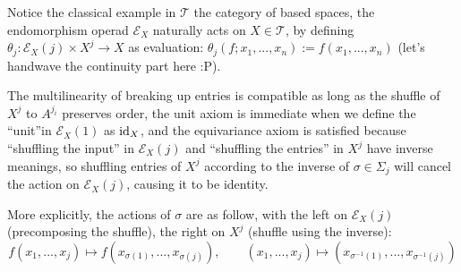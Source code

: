 \documentclass{article}
\begin{document}
\begin{exmp}
    Notice the classical example in $\mathcal{T}$ the category of based spaces, the endomorphism operad $\mathcal{E}_X$ naturally acts on $X\in\mathcal{T}$, by defining $\theta_j:\mathcal{E}_X (j)\times X^j\rightarrow X$ as evaluation: $\theta_j (f; x_1,...,x_n):= f(x_1,...,x_n)$ (let's handwave the continuity part here :P). 

    The multilinearity of breaking up entries is compatible as long as the shuffle of $X^j$ to $A^{j_i}$ preserves order, the unit axiom is immediate when we define the ``unit''in $\mathcal{E}_X (1)$ as $\mathrm{id}_X$, and the equivariance axiom is satisfied because ``shuffling the input'' in $\mathcal{E}_X (j)$ and ``shuffling the entries'' in $X^j$ have inverse meanings, so shuffling entries of $X^j$ according to the inverse of $\sigma\in \Sigma_j$ will cancel the action on $\mathcal{E}_X (j)$, causing it to be identity.

    More explicitly, the actions of $\sigma$ are as follow, with the left on $\mathcal{E}_X (j)$ (precomposing the shuffle), the right on $X^j$ (shuffle using the inverse):
    \[f(x_1,...,x_j)\mapsto f(x_{\sigma(1)},...,x_{\sigma(j)}),\quad\quad (x_1,...,x_j)\mapsto (x_{\sigma^{-1}(1)},...,x_{\sigma^{-1}(j)})\]
\end{exmp}
\end{document}
